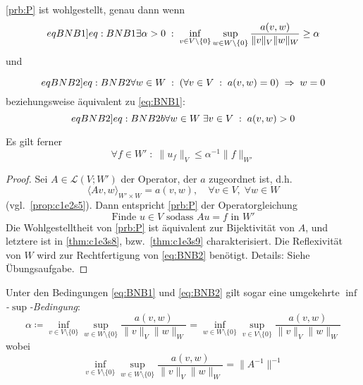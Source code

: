 \documentclass[../skript.tex]{subfiles}
\begin{document}
\begin{theorem} \label{thm:c1e4s2} %
	{
	\addtocounter{equation}{-1}
	\def\theequation{BNB 1}
	\cref{prb:P} ist wohlgestellt, genau dann wenn
	\begin{equation} %
	\label[eqBNB1]{eq:BNB1}
		\exists\alpha > 0 \; : \; \inf_{v\in V\setminus\{0\}} \sup_{w\in W\setminus\{0\}} \frac{a(v,w)}{\| v \|_V \| w \|_W} \geq\alpha
	\end{equation}
	und
	\addtocounter{equation}{-2}
	\def\theequation{BNB 2}
	\begin{equation} %
	\label[eqBNB2]{eq:BNB2}
		\forall w\in W \; : \; \left(\forall v\in V \; : \; a(v,w) = 0\right)\;\Rightarrow\;w=0
	\end{equation}
	beziehungsweise äquivalent zu \cref{eq:BNB1}:
	\begin{equation} %
	\label[eqBNB2]{eq:BNB2b}
		\forall w\in W \; \exists v\in V \; :\; a(v,w) > 0
	\end{equation}
	}
	Es gilt ferner
	\[
		\forall f\in W' \; :\; \| u_f \|_V \leq\alpha^{-1}\| f \|_{W'}
	\]
\end{theorem}

\begin{proof}
	Sei $A\in\mathcal{L}(V;W')$ der Operator, der $a$ zugeordnet ist, d.h.
	\[
		\langle Av, w \rangle_{W'\times W} = a(v,w),\quad\forall v\in V, \; \forall w\in W
	\]
	(vgl.~\cref{prop:c1e2s5}). Dann entspricht \cref{prb:P} der Operatorgleichung
	\[
		\text{Finde }u\in V\text{ sodass } Au = f\text{ in } W'
	\]
	Die Wohlgestelltheit von \cref{prb:P} ist äquivalent zur Bijektivität von $A$, und letztere ist in \cref{thm:c1e3s8}, bzw.~\cref{thm:c1e3s9} charakterisiert. Die Reflexivität von $W$ wird zur Rechtfertigung von \cref{eq:BNB2} benötigt. Details: Siehe Übungsaufgabe.
\end{proof}

\begin{remark} %
\label{bem:c1e4s3}
	Unter den Bedingungen \cref{eq:BNB1} und \cref{eq:BNB2} gilt sogar eine umgekehrte \emph{$\inf$-$\sup$-Bedingung}:
	\[
		\alpha \coloneqq \inf_{v\in V\setminus\{0\}}\sup_{w\in W\setminus\{0\}}\frac{a(v,w)}{\| v \|_V \| w \|_W} = \inf_{w\in W\setminus\{0\}}\sup_{v\in V\setminus\{0\}}\frac{a(v,w)}{\| v \|_V \| w \|_W}
	\]
	wobei 
	\[
		\inf_{v\in V\setminus\{0\}}\sup_{w\in W\setminus\{0\}}\frac{a(v,w)}{\| v \|_V \| w \|_W} = \| A^{-1} \| ^{-1}
	\]
\end{remark}
\end{document}
